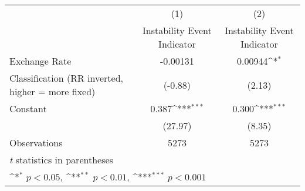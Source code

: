 {
\def\sym#1{\ifmmode^{#1}\else\(^{#1}\)\fi}
\begin{tabular}{l*{2}{c}}
\hline\hline
                    &\multicolumn{1}{c}{(1)}&\multicolumn{1}{c}{(2)}\\
                    &\multicolumn{1}{c}{Instability Event Indicator}&\multicolumn{1}{c}{Instability Event Indicator}\\
\hline
Exchange Rate       &    -0.00131         &     0.00944\sym{*}  \\
Classification (RR inverted, higher = more fixed)&     (-0.88)         &      (2.13)         \\
[1em]
Constant            &       0.387\sym{***}&       0.300\sym{***}\\
                    &     (27.97)         &      (8.35)         \\
\hline
Observations        &        5273         &        5273         \\
\hline\hline
\multicolumn{3}{l}{\footnotesize \textit{t} statistics in parentheses}\\
\multicolumn{3}{l}{\footnotesize \sym{*} \(p<0.05\), \sym{**} \(p<0.01\), \sym{***} \(p<0.001\)}\\
\end{tabular}
}
